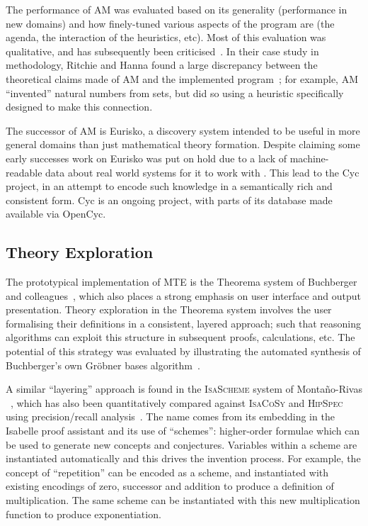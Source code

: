 The performance of AM was evaluated based on its generality (performance in new
domains) and how finely-tuned various aspects of the program are (the agenda,
the interaction of the heuristics, etc). Most of this evaluation was
qualitative, and has subsequently been criticised~\cite[chap.~13]{colton:book}.
In their case study in methodology, Ritchie and Hanna found a large discrepancy
between the theoretical claims made of AM and the implemented
program~\cite{ritchie1984case}; for example, AM ``invented'' natural numbers
from sets, but did so using a heuristic specifically designed to make this
connection.

The successor of AM is Eurisko, a discovery system intended to be useful in more
general domains than just mathematical theory formation. Despite claiming some
early successes %
work on Eurisko was put on hold due to a lack of machine-readable data about
real world systems for it to work with %
. This lead to the Cyc project, in an attempt to encode such knowledge in a
semantically rich and consistent form. Cyc is an ongoing project, with parts of
its database made available via OpenCyc.

\subsection{Theory Exploration}

The prototypical implementation of MTE is the Theorema system of Buchberger and
colleagues~\cite{buchberger,buchberger2016theorema}, which also places a strong
emphasis on user interface and output presentation. Theory exploration in the
Theorema system involves the user formalising their definitions in a consistent,
layered approach; such that reasoning algorithms can exploit this structure in
subsequent proofs, calculations, etc. The potential of this strategy was
evaluated by illustrating the automated synthesis of Buchberger's own Gr\"obner
bases algorithm~\cite{buchberger:04}.

A similar ``layering'' approach is found in the \textsc{IsaScheme} system of
Monta{\~n}o-Rivas \etal{}~\cite{Montano-Rivas.McCasland.Dixon.ea:2012}, which
has also been quantitatively compared against \textsc{IsaCoSy} and
\textsc{HipSpec} using precision/recall analysis~\cite{claessen2013automating}.
The name comes from its embedding in the Isabelle proof assistant and its use of
``schemes'': higher-order formulae which can be used to generate new concepts
and conjectures. Variables within a scheme are instantiated automatically and
this drives the invention process. For example, the concept of ``repetition''
can be encoded as a scheme, and instantiated with existing encodings of zero,
successor and addition to produce a definition of multiplication. The same
scheme can be instantiated with this new multiplication function to produce
exponentiation.


